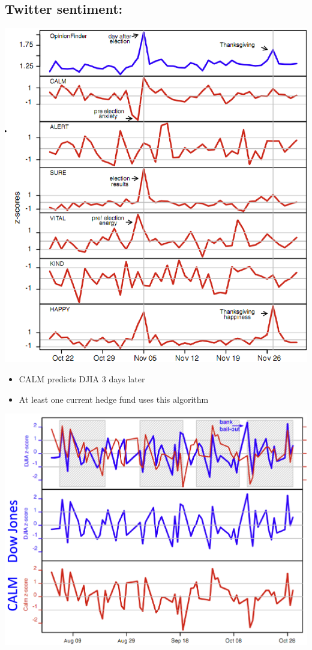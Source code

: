 \documentclass[11pt]{article}
\theoremstyle{definition}
\begin{document}
\subsection{Twitter sentiment:}
\includegraphics[width=\textwidth/2]{8.png}
\begin{itemize}
  \item CALM predicts
  DJIA 3 days
  later
  \item At least one
  current hedge
  fund uses this
  algorithm
\end{itemize}
\includegraphics[width=\textwidth/2]{9.png}
\end{document}
